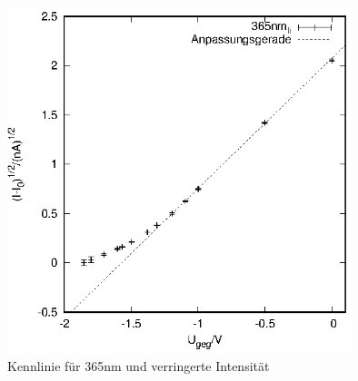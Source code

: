 \begin{figure}[h]
  \centering
  \includegraphics[width=10cm]{data/Messung_photoeffekt/365nm_low_intensity.eps}
  \caption{Kennlinie für 365nm und verringerte Intensität}
  \label{fig:lowintensity}
\end{figure}

